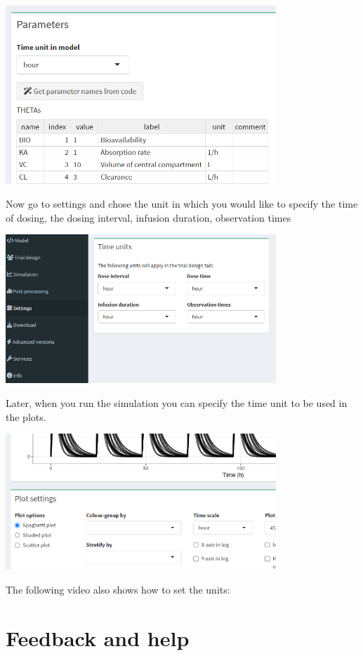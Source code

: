 \documentclass[
]{book}
\begin{document}
\includegraphics[width=4.01042in,height=\textheight]{pictures/model_time.png}

Now go to settings and chose the unit in which you would like to specify the time of dosing, the dosing interval, infusion duration, observation times

\includegraphics[width=4.01042in,height=\textheight]{pictures/time-units.png}

Later, when you run the simulation you can specify the time unit to be used in the plots.

\includegraphics[width=4.01042in,height=\textheight]{pictures/time-units-plot.png}

The following video also shows how to set the units:

\chapter{Feedback and help}\label{feedback-and-help}
\end{document}
